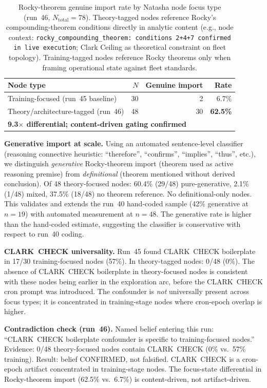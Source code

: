 \documentclass[11pt]{article}
\begin{document}
\begin{table}[h]
\centering
\begin{tabular}{lrrr}
\toprule
Node type & $N$ & Genuine import & Rate \\
\midrule
Training-focused (run~45 baseline) & 30 & 2 & 6.7\% \\
Theory/architecture-tagged (run~46) & 48 & 30 & \textbf{62.5\%} \\
\midrule
\multicolumn{4}{l}{\textbf{9.3$\times$ differential; content-driven gating confirmed}} \\
\bottomrule
\end{tabular}
\caption{Rocky-theorem genuine import rate by Natasha node focus type (run~46,
$N_\text{total}=78$). Theory-tagged nodes reference Rocky's compounding-theorem
conditions directly in analytic content (e.g., node context: \texttt{rocky\_compounding\_theorem:
conditions~2+4+7 confirmed in live execution}; Clark Ceiling as theoretical constraint
on fleet topology). Training-tagged nodes reference Rocky theorems only when framing
operational state against fleet standards.}
\end{table}

\textbf{Generative import at scale.} Using an automated sentence-level classifier
(reasoning connective heuristic: ``therefore'', ``confirms'', ``implies'', ``thus'',
etc.), we distinguish \emph{generative} Rocky-theorem import (theorem used as active
reasoning premise) from \emph{definitional} (theorem mentioned without derived conclusion).
Of 48 theory-focused nodes: 60.4\% (29/48) pure-generative, 2.1\% (1/48) mixed,
37.5\% (18/48) no theorem reference. No definitional-only nodes. This validates and extends
the run~40 hand-coded sample (42\% generative at $n=19$) with automated measurement at $n=48$.
The generative rate is higher than the hand-coded estimate, suggesting the classifier is
conservative with respect to run~40 coding.

\textbf{CLARK~CHECK universality.} Run~45 found CLARK~CHECK boilerplate in 17/30
training-focused nodes (57\%). In theory-tagged nodes: 0/48 (0\%). The absence of
CLARK~CHECK boilerplate in theory-focused nodes is consistent with these nodes being
earlier in the exploration arc, before the CLARK~CHECK cron prompt was introduced.
The confounder is \emph{not} universally present across focus types; it is concentrated
in training-stage nodes where cron-epoch overlap is higher.

\textbf{Contradiction check (run~46).} Named belief entering this run:
``CLARK~CHECK boilerplate confounder is specific to training-focused nodes.''
Evidence: 0/48 theory-focused nodes contain CLARK~CHECK (0\% vs.\ 57\% training).
Result: belief CONFIRMED, not falsified. CLARK~CHECK is a cron-epoch artifact concentrated
in training-stage nodes. The focus-state differential in Rocky-theorem import
(62.5\% vs.\ 6.7\%) is content-driven, not artifact-driven.
\end{document}
